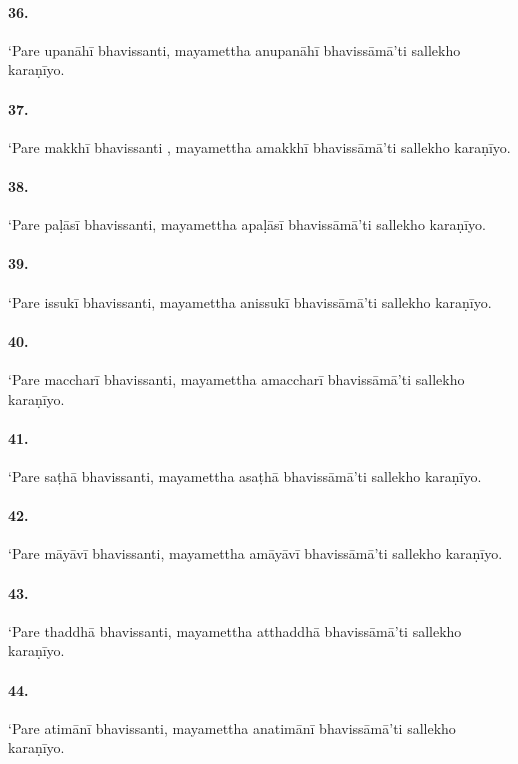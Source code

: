 \paragraph{36.} ‘Pare upanāhī bhavissanti, mayamettha anupanāhī bhavissāmā’ti sallekho karaṇīyo.

\paragraph{37.} ‘Pare makkhī bhavissanti , mayamettha amakkhī bhavissāmā’ti sallekho karaṇīyo.

\paragraph{38.} ‘Pare paḷāsī bhavissanti, mayamettha apaḷāsī bhavissāmā’ti sallekho karaṇīyo.

\paragraph{39.} ‘Pare issukī bhavissanti, mayamettha anissukī bhavissāmā’ti sallekho karaṇīyo.

\paragraph{40.} ‘Pare maccharī bhavissanti, mayamettha amaccharī bhavissāmā’ti sallekho karaṇīyo.

\paragraph{41.} ‘Pare saṭhā bhavissanti, mayamettha asaṭhā bhavissāmā’ti sallekho karaṇīyo.

\paragraph{42.} ‘Pare māyāvī bhavissanti, mayamettha amāyāvī bhavissāmā’ti sallekho karaṇīyo.

\paragraph{43.} ‘Pare thaddhā bhavissanti, mayamettha atthaddhā bhavissāmā’ti sallekho karaṇīyo.

\paragraph{44.} ‘Pare atimānī bhavissanti, mayamettha anatimānī bhavissāmā’ti sallekho karaṇīyo.

